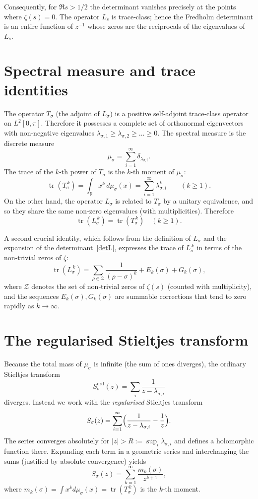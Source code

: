 \documentclass[11pt,a4paper]{article}
\theoremstyle{definition}
\newcommand{\R}{\mathbb{R}}
\newcommand{\Z}{\mathcal{Z}}  %
\newcommand{\tr}{\operatorname{tr}}
\begin{document}
Consequently, for \(\Re s > 1/2\) the determinant vanishes precisely at the points where \(\zeta(s)=0\).
The operator \(L_s\) is trace‑class; hence the Fredholm determinant is an entire function of \(z^{-1}\) whose zeros are the reciprocals of the eigenvalues of \(L_s\).

\section{Spectral measure and trace identities}
The operator \(T_\sigma\) (the adjoint of \(L_\sigma\)) is a positive self‑adjoint trace‑class operator on \(L^2[0,\pi]\).
Therefore it possesses a complete set of orthonormal eigenvectors with non‑negative eigenvalues \(\lambda_{\sigma,1} \ge \lambda_{\sigma,2} \ge \dots \ge 0\).
The spectral measure is the discrete measure
\[
\mu_\sigma = \sum_{i=1}^\infty \delta_{\lambda_{\sigma,i}}.
\]
The trace of the \(k\)-th power of \(T_\sigma\) is the \(k\)-th moment of \(\mu_\sigma\):
\[
\tr(T_\sigma^{\,k}) = \int_{\R} x^k \, d\mu_\sigma(x) = \sum_{i=1}^\infty \lambda_{\sigma,i}^k \qquad (k \ge 1).
\]
On the other hand, the operator \(L_\sigma\) is related to \(T_\sigma\) by a unitary equivalence, and so they share the same non‑zero eigenvalues (with multiplicities).
Therefore
\[
\tr(L_\sigma^{\,k}) = \tr(T_\sigma^{\,k}) \quad (k \ge 1).
\]

A second crucial identity, which follows from the definition of \(L_\sigma\) and the expansion of the determinant~\eqref{detL}, expresses the trace of \(L_\sigma^{\,k}\) in terms of the non‑trivial zeros of \(\zeta\):
\begin{equation}\label{tracezero}
\tr(L_\sigma^{\,k}) = \sum_{\rho \in \Z} \frac{1}{(\rho-\sigma)^k} + E_k(\sigma) + G_k(\sigma),
\end{equation}
where \(\Z\) denotes the set of non‑trivial zeros of \(\zeta(s)\) (counted with multiplicity), and the sequences \(E_k(\sigma), G_k(\sigma)\) are summable corrections that tend to zero rapidly as \(k \to \infty\).

\section{The regularised Stieltjes transform}
Because the total mass of \(\mu_\sigma\) is infinite (the sum of ones diverges), the ordinary Stieltjes transform
\[
S_{\sigma}^{\mathrm{ord}}(z) = \sum_{i} \frac{1}{z - \lambda_{\sigma,i}}
\]
diverges.
Instead we work with the \emph{regularised} Stieltjes transform
\[
S_\sigma(z) = \sum_{i=1}^\infty \Bigl( \frac{1}{z - \lambda_{\sigma,i}} - \frac{1}{z} \Bigr).
\]
The series converges absolutely for \(|z| > R := \sup_i \lambda_{\sigma,i}\) and defines a holomorphic function there.
Expanding each term in a geometric series and interchanging the sums (justified by absolute convergence) yields
\[
S_\sigma(z) = \sum_{k=1}^\infty \frac{m_k(\sigma)}{z^{k+1}},
\]
where \(m_k(\sigma) = \int x^k d\mu_\sigma(x) = \tr(T_\sigma^{\,k})\) is the \(k\)-th moment.
\end{document}
